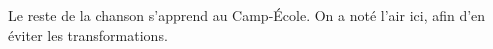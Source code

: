 \footnotesize Le reste de la chanson s'apprend au Camp-École. On a noté l'air ici, afin d'en éviter les transformations.
